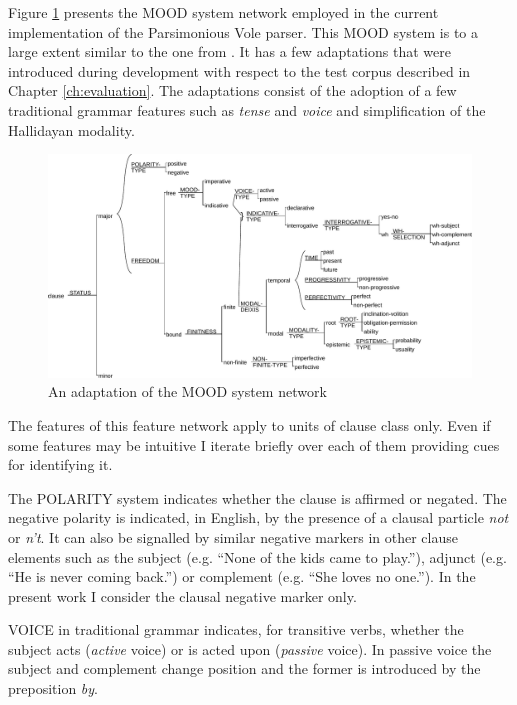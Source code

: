     Figure \ref{fig:clause-mood} presents the MOOD system network employed in the current implementation of the Parsimonious Vole parser. This MOOD system is to a large extent similar to the one from \citet[162]{Halliday2013}. It has a few adaptations that were introduced during development with respect to the test corpus described in Chapter \ref{ch:evaluation}. The adaptations consist of the adoption of a few traditional grammar features such as \textit{tense} and \textit{voice} and simplification of the Hallidayan modality.
        
    \begin{figure}[!ht]
        \centering
        \includegraphics[width=\linewidth]{Figures/SFL-grammar/mood-simplified.pdf}
        \caption{An adaptation of the MOOD system network \citep[162]{Halliday2013}}
        \label{fig:clause-mood}
    \end{figure}

    The features of this feature network apply to units of clause class only. Even if some features may be intuitive I iterate briefly over each of them providing cues for identifying it. 
    
    The POLARITY system indicates whether the clause is affirmed or negated. The negative polarity is indicated, in English, by the presence of a clausal particle \textit{not} or \textit{n't}. It can also be signalled by similar negative markers in other clause elements such as the subject (e.g. ``None of the kids came to play.''), adjunct (e.g. ``He is never coming back.'') or complement (e.g. ``She loves no one.''). In the present work I consider the clausal negative marker only. 
    
    VOICE in traditional grammar indicates, for transitive verbs, whether the subject acts (\textit{active} voice) or is acted upon (\textit{passive} voice). In passive voice the subject and complement change position and the former is introduced by the preposition \textit{by}. 
    
